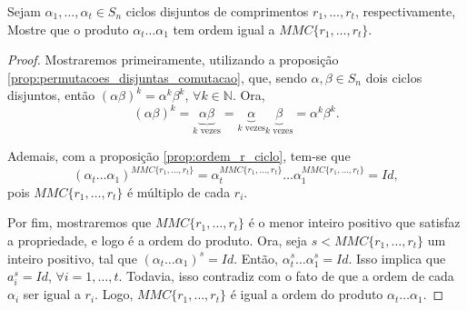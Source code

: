 \documentclass[11pt,openany]{book}
\begin{document}
\begin{proposition}
\label{prop:produto_ciclos_disjuntos_ordem_MMC}
    Sejam $\alpha_1, \dots, \alpha_t \in S_n$ ciclos disjuntos de comprimentos $r_1, \dots, r_t$, respectivamente, Mostre que o produto $\alpha_t \dots \alpha_1$ tem ordem igual a $MMC\{r_1, \dots, r_t\}$.
\end{proposition}

\begin{proof}
    Mostraremos primeiramente, utilizando a proposição \ref{prop:permutacoes_disjuntas_comutacao}, que, sendo $\alpha, \beta \in S_n$ dois ciclos disjuntos, então $(\alpha\beta)^k = \alpha^k \beta^k$, $\forall k \in \mathbb{N}$. Ora,
    \[(\alpha\beta)^k = \underbrace{\alpha\beta}_{\text{$k$ vezes}} = \underbrace{\alpha}_{\text{$k$ vezes}} \underbrace{\beta}_{\text{$k$ vezes}} = \alpha^k \beta^k.\]

    Ademais, com a proposição \ref{prop:ordem_r_ciclo}, tem-se que
    \[(\alpha_t \dots \alpha_1)^{MMC\{r_1, \dots, r_t\}} = \alpha_t^{MMC\{r_1, \dots, r_t\}} \dots \alpha_1^{MMC\{r_1, \dots, r_t\}} = Id,\]
    pois $MMC\{r_1, \dots, r_t\}$ é múltiplo de cada $r_i$.

    Por fim, mostraremos que $MMC\{r_1, \dots, r_t\}$ é o menor inteiro positivo que satisfaz a propriedade, e logo é a ordem do produto. Ora, seja $s < MMC\{r_1, \dots, r_t\}$ um inteiro positivo, tal que $(\alpha_t \dots \alpha_1)^s = Id$. Então, $\alpha_t^s \dots \alpha_1^s = Id$. Isso implica que $a_i^s = Id$, $\forall i = 1, \dots, t$. Todavia, isso contradiz com o fato de que a ordem de cada $\alpha_i$ ser igual a $r_i$. Logo, $MMC\{r_1, \dots, r_t\}$ é igual a ordem do produto $\alpha_t \dots \alpha_1$.
\end{proof}
\end{document}
